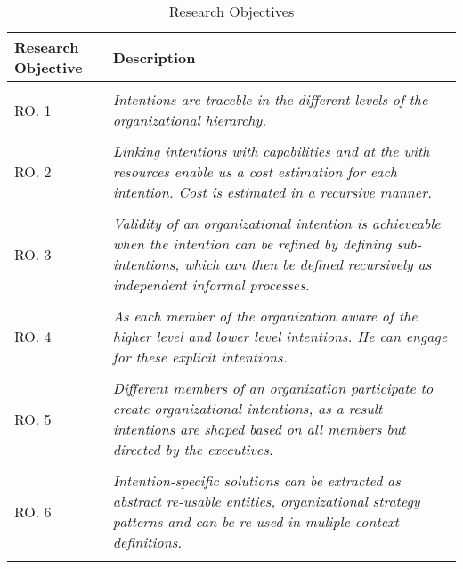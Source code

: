 \begin{center}
	\begin{longtable}{p{5cm}p{11cm}} 
   	\toprule 
	\textbf{Research Objective} & \textbf{Description} \\
	\midrule
	\endfirsthead
	\\
	RO. 1 & \textit{Intentions are traceble in the different levels of the organizational hierarchy. } \label{ro1} \\
	\\[-1.5ex]
	RO. 2 & \textit{Linking intentions with capabilities and at the with resources enable us a cost estimation for each intention. Cost is estimated in a recursive manner.} \label{ro2} \\
	\\[-1.5ex]
	RO. 3 & \textit{Validity of an organizational intention is achieveable when the intention can be refined by defining sub-intentions, which can then be defined recursively as independent informal processes.} \label{ro3}\\
	\\[-1.5ex]
	RO. 4 & \textit{As each member of the organization aware of the higher level and lower level intentions. He can engage for these explicit intentions. } \label{ro4}\\
	\\[-1.5ex]
	RO. 5 & \textit{Different members of an organization participate to create organizational intentions, as a result intentions are shaped based on all members but directed by the executives.} \label{ro5}\\
	\\[-1.5ex]
	RO. 6 & \textit{Intention-specific solutions can be extracted as abstract re-usable entities, organizational strategy patterns and can be re-used in muliple context definitions.} \label{ro6}\\
	
	\bottomrule
	\caption{Research Objectives}
	\label{tab:researchobjectives}
	\end{longtable}	
\end{center}

